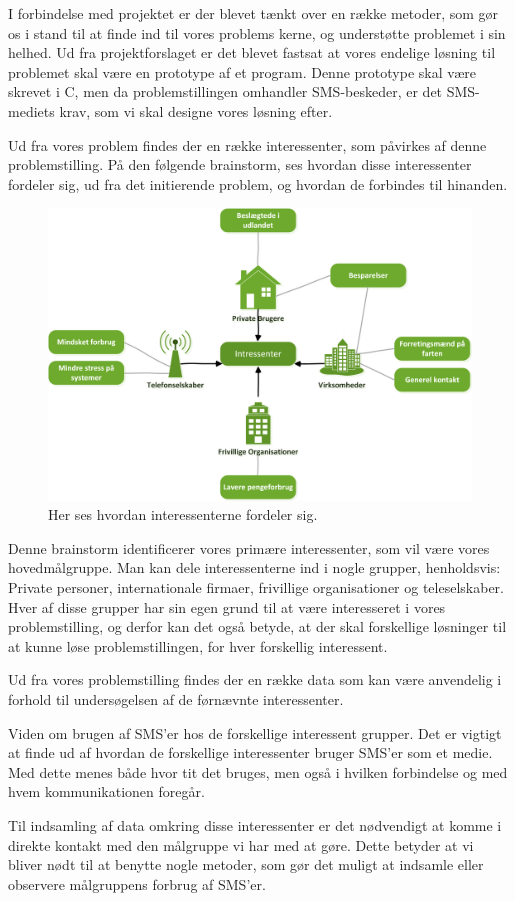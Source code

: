 I forbindelse med projektet er der blevet tænkt over en række metoder, som gør os i stand til at finde ind til vores problems kerne, og understøtte problemet i sin helhed.
Ud fra projektforslaget er det blevet fastsat at vores endelige løsning til problemet skal være en prototype af et program. Denne prototype skal være skrevet i C, men da problemstillingen omhandler SMS-beskeder, er det  SMS-mediets krav, som vi skal designe vores løsning efter.


Ud fra vores problem findes der en række interessenter, som påvirkes af denne problemstilling.
På den følgende brainstorm, ses hvordan disse interessenter fordeler sig, ud fra det initierende problem, og hvordan de forbindes til hinanden.

\begin{figure}[H]
\includegraphics[width=\linewidth]{Billeder/Brainstormting.png}
\caption{Her ses hvordan interessenterne fordeler sig.}
\end{figure}

Denne brainstorm identificerer vores primære interessenter, som vil være vores hovedmålgruppe.
Man kan dele interessenterne ind i nogle grupper, henholdsvis: Private personer, internationale firmaer, frivillige organisationer og teleselskaber.
Hver af disse grupper har sin egen grund til at være interesseret i vores problemstilling, og derfor kan det også betyde, at der skal forskellige løsninger til at kunne løse problemstillingen, for hver forskellig interessent.


Ud fra vores problemstilling findes der en række data som kan være anvendelig i forhold til undersøgelsen af de førnævnte interessenter.


Viden om brugen af SMS'er hos de forskellige interessent grupper.
Det er vigtigt at finde ud af hvordan de forskellige interessenter bruger SMS'er som et medie. Med dette menes både hvor tit det bruges, men også i hvilken forbindelse og med hvem kommunikationen foregår.


Til indsamling af data omkring disse interessenter er det nødvendigt at komme i direkte kontakt med den målgruppe vi har med at gøre. Dette betyder at vi bliver nødt til at benytte nogle metoder, som gør det muligt at indsamle eller observere målgruppens forbrug af SMS'er.
